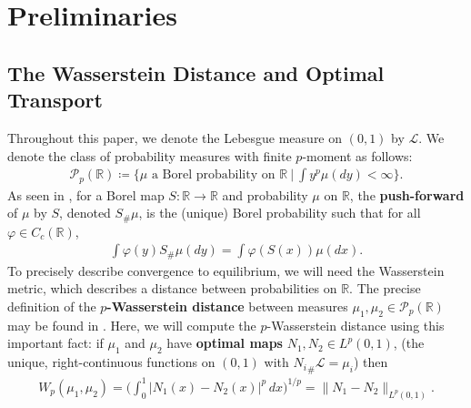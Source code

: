 \documentclass[10pt,a4paper]{amsart}
\newtheorem{defn}[thm]{Definition}
\numberwithin{equation}{section}
\begin{document}
\section{Preliminaries}
\subsection{The Wasserstein Distance and Optimal Transport}\label{OptimalTransport-section}
    Throughout this paper, we denote the Lebesgue measure on $(0,1)$ by $\mathcal{L}$. We denote the class of probability measures with finite $p$-moment as follows:
    \begin{align*}
        \mathcal{P}_p(\mathbb{R})\coloneq\big\{\mu \text{ a Borel probability on }\mathbb{R}\ \big|\ \int y^p\mu(dy)<\infty\big\}.
    \end{align*}
    As seen in \cite{Villani}, for a Borel map $S:\mathbb{R}\to\mathbb{R}$ and probability $\mu$ on $\mathbb{R}$, the \textbf{push-forward} of $\mu$ by $S$, denoted $S_\#\mu$, is the (unique) Borel probability such that for all $\varphi\in C_c(\mathbb{R})$,
    \begin{align*}
        \int\varphi(y)S_\#\mu(dy)=\int\varphi(S(x))\mu(dx). 
    \end{align*}
    To precisely describe convergence to equilibrium, we will need the Wasserstein metric, which describes a distance between probabilities on $\mathbb{R}$. The precise definition of the \textbf{$p$-Wasserstein distance} between measures $\mu_1,\mu_2\in\mathcal{P}_p(\mathbb{R})$ may be found in \cite{Villani}. 
    Here, we will compute the $p$-Wasserstein distance using this important fact: if $\mu_1$ and $\mu_2$ have \textbf{optimal maps} $N_1, N_2\in L^p(0,1)$, (the unique, right-continuous functions on $(0,1)$ with ${N_i}_\#\mathcal{L}=\mu_i$) then  
    \begin{align*}
        W_p(\mu_1, \mu_2)=\Big(\int_0^1 \big|N_1(x)-N_2(x)\big|^p \, dx\Big)^{1/p}=\|N_1-N_2\|_{L^p(0,1)}.
    \end{align*}
\end{document}
